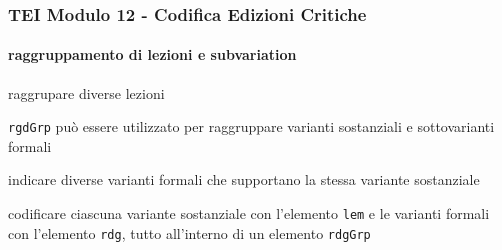 \begin{frame}
    \frametitle{TEI Modulo 12 - Codifica Edizioni Critiche}
    \framesubtitle{raggruppamento di lezioni e subvariation}
    \addtocounter{nframe}{1}










    \begin{block}{raggrupare diverse lezioni}
        \item \texttt{rgdGrp} può essere utilizzato per raggruppare varianti sostanziali e sottovarianti formali
        \item indicare diverse varianti formali che supportano la stessa variante sostanziale
        \item codificare ciascuna variante sostanziale con l'elemento \texttt{lem} e le varianti formali con l'elemento \texttt{rdg}, tutto all'interno di un elemento \texttt{rdgGrp}
    \end{block}


\end{frame}


